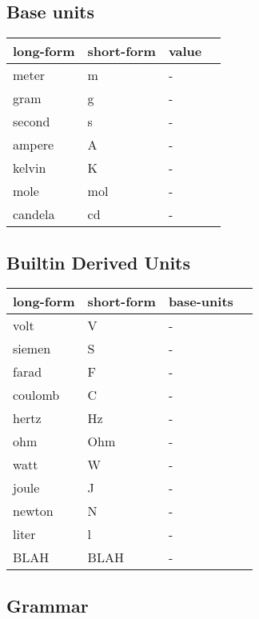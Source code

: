 \documentclass{article}
\begin{document}
\subsection*{Base units}

\begin{center}
    \begin{tabular}{ | l | l |  l | p{5cm} |}
    \hline
    long-form & short-form & value  \\ \hline
    meter & m & - \\ \hline
    gram & g & - \\ \hline
    second & s & - \\ \hline
    ampere & A & - \\ \hline
    kelvin & K & - \\ \hline
    mole & mol & - \\ \hline
    candela & cd & - \\ \hline
    \end{tabular}
\end{center}

\subsection{Builtin Derived Units}

\begin{center}
    \begin{tabular}{ | l | l |  l | p{5cm} |}
    \hline
    long-form & short-form & base-units  \\ \hline
    volt & V & - \\ \hline
    siemen & S & - \\ \hline
    farad & F & - \\ \hline
    coulomb & C & - \\ \hline
    hertz & Hz & - \\ \hline
    ohm & Ohm & - \\ \hline
    watt & W & - \\ \hline
    joule & J & - \\ \hline
    newton & N & - \\ \hline
    liter & l & - \\ \hline
    BLAH & BLAH & - \\ \hline
    \end{tabular}
\end{center}


\newpage
\subsection*{Grammar}
\end{document}
